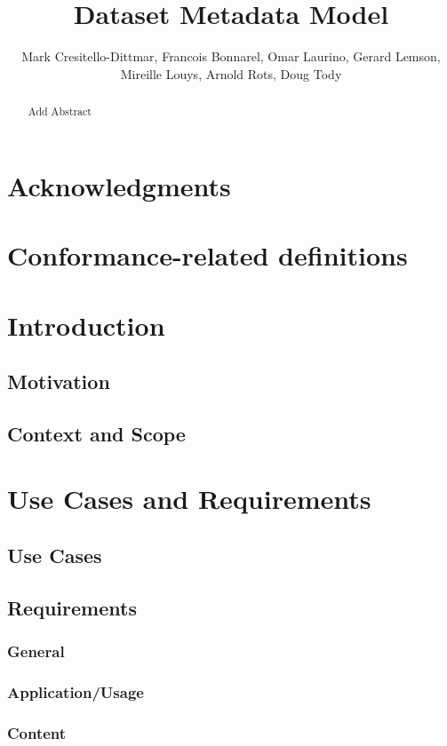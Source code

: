 \documentclass[11pt,a4paper]{ivoa}
\title{Dataset Metadata Model}
\author{Mark Cresitello-Dittmar, Francois Bonnarel, Omar Laurino, Gerard Lemson, Mireille Louys, Arnold Rots, Doug Tody}
\begin{document}
\begin{abstract}
  Add Abstract
\end{abstract}


\section*{Acknowledgments}

\section*{Conformance-related definitions}


\section{Introduction}

\subsection{Motivation}

\subsection{Context and Scope}

\section{Use Cases and Requirements}
\label{sect:ucreq}

\subsection{Use Cases}
\label{sect:usecases}

\subsection{Requirements}
\label{sect:reqs}

\subsubsection{General}

\subsubsection{Application/Usage}

\subsubsection{Content}
\end{document}

